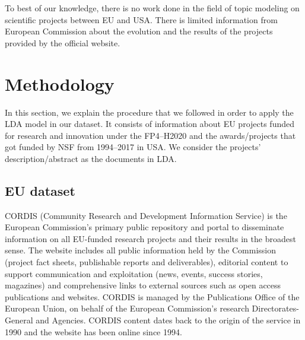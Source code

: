 \documentclass[12pt]{report}
\begin{document}
To best of our knowledge, there is no work done in the field of topic modeling
on scientific projects between EU and USA. There is limited information from
European Commission about the evolution and the results of the projects provided
by the official website.

\section{Methodology}
\label{methodology}
In this section, we explain the procedure that we followed in order to
apply the LDA model in our dataset. It consists of information about 
EU projects funded for research and innovation under the FP4--H2020 
and the awards/projects that got funded by NSF from 1994--2017 in USA. We
consider the projects' description/abstract as the documents in LDA.

\subsection{EU dataset}
\label{EUdataset}
CORDIS (Community Research and Development Information Service) is the European
Commission's primary public repository and portal to disseminate information on
all EU-funded research projects and their results in the broadest sense. The
website includes all public information held by the Commission (project
fact sheets, publishable reports and deliverables), editorial content to support
communication and exploitation (news, events, success stories, magazines) and
comprehensive links to external sources such as open access publications and
websites. CORDIS is managed by the Publications Office of the European Union, on
behalf of the European Commission's research Directorates-General and Agencies.
CORDIS content dates back to the origin of the service in 1990 and the website
has been online since 1994.
\end{document}
